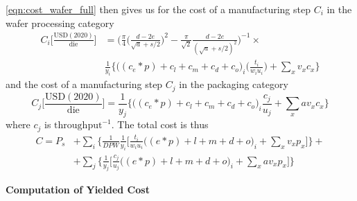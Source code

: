 \documentclass[parskip=full]{article}
\begin{document}
\cref{eqn:cost_wafer_full} then gives us for the cost of a manufacturing step $C_i$ in the wafer processing category
%
\begin{equation}
\label{eqn:cost_wafer_full}
\begin{split}
    C_i \bigg[ \frac{ \text{USD}(2020) }{ \text{die} } \bigg] &= \bigg (  \frac{\pi}{4}  \bigg ( \frac{d-2e}{\sqrt{a}+s/2} \bigg ) ^2 - \frac{\pi}{\sqrt{2}}\frac{d-2e}{(\sqrt{a}+s/2)^2} \bigg )^{-1} \times \\
    &  \frac{1}{y_i}  \bigg\{ \bigg((c_e*p) + c_l + c_m + c_d + c_o \bigg)_i \bigg( \frac{t_i}{w_i u_i} \bigg) + \sum_{x} v_x c_x \bigg\}
\end{split}
\end{equation}
%
and the cost of a manufacturing step $C_j$ in the packaging category
%
\begin{equation}
\label{eqn:cost_die}
    C_j \bigg[ \frac{ \text{USD}(2020) }{ \text{die} } \bigg] = \frac{1}{y_j}  \bigg\{ \bigg((c_e*p) + c_l + c_m + c_d + c_o \bigg)_i  \frac{c_j}{u_j} + \sum_{x} a v_x c_x \bigg\}
\end{equation}
where $c_j$ is $\text{throughput}^{-1}$. The total cost is thus
%
\begin{equation}
\label{eqn:cost_total}
\begin{split}
    C= P_s &+ \sum_i \bigg \{ \frac{1}{DPW} \frac{1}{y_i} \bigg[ \frac{t_i}{w_i u_i} \bigg((e*p) + l + m + d +o \bigg)_i  + \sum_{x} v_x p_x \bigg] \bigg \} + \\
    & + \sum_j \bigg \{ \frac{1}{y_j} \bigg[ \frac{c_j}{u_j}  \bigg((e*p) + l + m + d + o \bigg)_i + \sum_{x} a v_x p_x \bigg ] \bigg\}
\end{split}
\end{equation}

\textbf{Computation of Yielded Cost}
\end{document}
